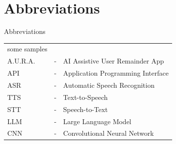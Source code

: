 \begin{titlepage}
\begin{center}
\begin{tabular}{ll}
\end{tabular}

\end{center}
 

\end{titlepage}






\tableofcontents

\listoffigures
{}

\clearpage
\renewcommand{\nomname}{Abbreviations}
\chapter*{Abbreviations}
{\numberline{}Abbreviations}
\vspace{20pt}
\begin{tabular}{l l l}
\\ some samples \\
A.U.R.A. & - & AI Assistive User Remainder App \\
API & - & Application Programming Interface \\
ASR & - & Automatic Speech Recognition \\
TTS & - & Text-to-Speech \\
STT & - & Speech-to-Text \\
LLM & - & Large Language Model \\
CNN & - & Convolutional Neural Network \\

 
\end{tabular}
\clearpage










